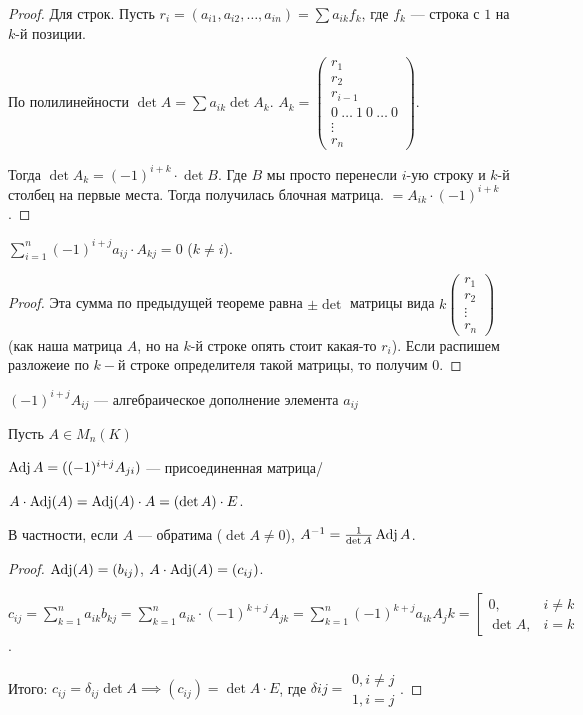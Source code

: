 \begin{proof}
    Для строк. Пусть $r_i = (a_{i1}, a_{i 2}, \ldots, a_{in}) = \sum a_{ik}f_k$, где $f_k$ --- строка с  $1$ на  $k$-й позиции.

    По полилинейности  $\det A = \sum a_{ik} \det A_k$.  $A_k = \begin{pmatrix} r_1 \\ r_2 \\ r_{i-1} \\ 0\ \ldots\ 1\ 0\ \ldots\ 0 \\ \vdots \\ r_n \end{pmatrix}$.

        Тогда $\det A_k = (-1)^{i+k} \cdot \det B$. Где  $B$ мы просто перенесли  $i$-ую строку и $k$-й столбец на первые места. Тогда получилась блочная матрица.  $= A_{ik} \cdot (-1)^{i+k}$.
\end{proof}
\begin{consequence}
    $\sum_{i=1}^n (-1)^{i+j} a_{ij} \cdot A_{kj} = 0$ ($k \neq i$).
\end{consequence}
\begin{proof}
    Эта сумма по предыдущей теореме равна $\pm \det$ матрицы вида  $k \begin{pmatrix} r_1 \\ r_2 \\ \vdots \\ r_n \end{pmatrix}$ (как наша матрица $A$, но на $k$-й строке опять стоит какая-то $r_i$). Если распишем разложеие по $k-$й строке определителя такой матрицы, то получим 0.
\end{proof}
\begin{definition}
    $(-1)^{i+j}A_{ij}$ --- алгебраическое дополнение элемента  $a_{ij}$
\end{definition}
\begin{definition}
    Пусть $A \in M_n(K)$

    $\operatorname{Adj} A = ((-1)^{i+j}A_{ji})$ --- присоединенная матрица/ 
\end{definition}
\begin{theorem}
    $A \cdot \operatorname{Adj}(A) = \operatorname{Adj}(A) \cdot A = (\det A) \cdot E$.

    В частности, если $A$ --- обратима ($\det A \neq 0$), $A^{-1} = \frac{1}{\det A} \operatorname{Adj} A$.
\end{theorem}
\begin{proof}
    $\operatorname{Adj}(A) = (b_{ij})$,  $A \cdot \operatorname{Adj}(A) = (c_{ij})$.

    $c_{ij} = \sum\limits_{k=1}^n a_{ik} b_{kj} = \sum\limits_{k=1}^n a_{ik} \cdot (-1)^{k+j} A_{jk} = \sum\limits_{k=1}^n (-1)^{k+j} a_{ik}A_jk = \left[ \begin{array}{ll} 0, & i \neq k \\ \det A, & i = k\end{array} \right.$.

    Итого: $c_{ij} = \delta_{ij} \det A \implies (c_{ij}) = \det A \cdot E$, где $\delta{ij} = \begin{array}{ll} 0, i \not = j \\ 1, i = j \end{array}$.
\end{proof}
